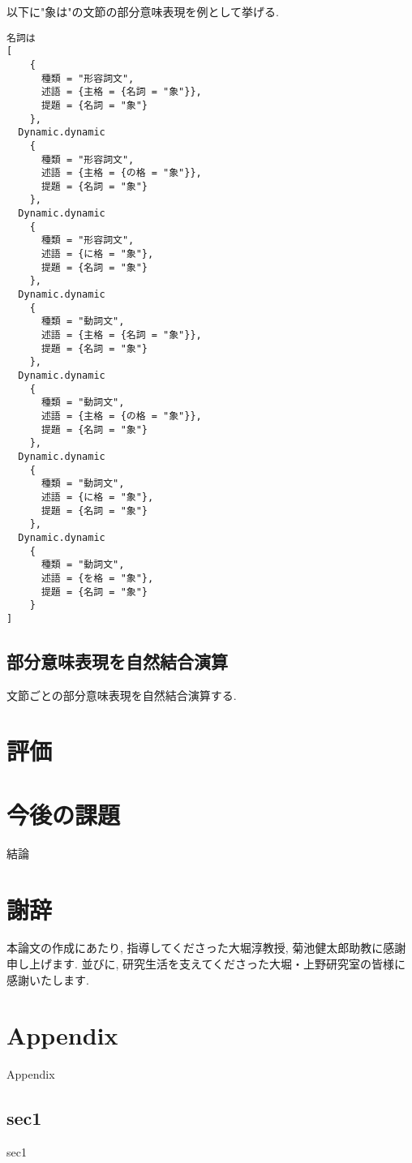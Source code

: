 \documentclass{jreport}
\begin{document}
以下に"象は"の文節の部分意味表現を例として挙げる.

\begin{verbatim}
名詞は 
[
    {
      種類 = "形容詞文",
      述語 = {主格 = {名詞 = "象"}},
      提題 = {名詞 = "象"}
    },
  Dynamic.dynamic
    {
      種類 = "形容詞文",
      述語 = {主格 = {の格 = "象"}},
      提題 = {名詞 = "象"}             
    },
  Dynamic.dynamic
    {
      種類 = "形容詞文",
      述語 = {に格 = "象"},
      提題 = {名詞 = "象"}             
    },
  Dynamic.dynamic
    {
      種類 = "動詞文",
      述語 = {主格 = {名詞 = "象"}},
      提題 = {名詞 = "象"}
    },
  Dynamic.dynamic
    {
      種類 = "動詞文",
      述語 = {主格 = {の格 = "象"}},
      提題 = {名詞 = "象"}             
    },
  Dynamic.dynamic
    {
      種類 = "動詞文",
      述語 = {に格 = "象"},
      提題 = {名詞 = "象"}             
    },
  Dynamic.dynamic
    {
      種類 = "動詞文",
      述語 = {を格 = "象"},
      提題 = {名詞 = "象"}             
    }                              
]
\end{verbatim}


\section{部分意味表現を自然結合演算}
文節ごとの部分意味表現を自然結合演算する. 


\chapter{評価}

\chapter{今後の課題}
結論

\chapter*{謝辞}
本論文の作成にあたり, 指導してくださった大堀淳教授, 菊池健太郎助教に感謝申し上げます.
並びに, 研究生活を支えてくださった大堀・上野研究室の皆様に感謝いたします.

\appendix
\chapter{Appendix}
Appendix
\section{sec1}
sec1
\end{document}
